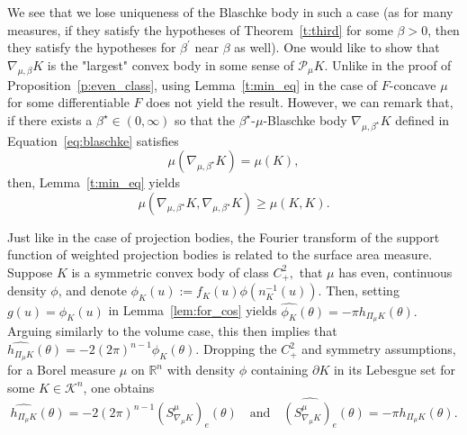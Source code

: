 \documentclass[11pt]{amsart}
\theoremstyle{definition}
\theoremstyle{remark}
\numberwithin{equation}{section}
\newcommand{\R}{\mathbb{R}}
\newcommand{\conbod}{\mathcal{K}^n}
\begin{document}
\noindent  We see that we lose uniqueness of the Blaschke body in such a case (as for many measures, if they satisfy the hypotheses of Theorem~\ref{t:third} for some $\beta>0$, then they satisfy the hypotheses for $\beta^\prime$ near $\beta$ as well). One would like to show that $\nabla_{\mu,\beta}K$ is the "largest" convex body in some sense of $\mathcal{P}_{\mu}K$. Unlike in the proof of Proposition~\ref{p:even_class}, using Lemma~\ref{t:min_eq} in the case of $F$-concave $\mu$ for some differentiable $F$ does not yield the result. However, we can remark that, if there exists a $\beta^\star\in(0,\infty)$ so that the $\beta^\star$-$\mu$-Blaschke body $\nabla_{\mu,\beta^\star} K$ defined in Equation~\ref{eq:blaschke} satisfies
$$\mu(\nabla_{\mu,\beta^\star} K)=\mu(K),$$
then, Lemma~\ref{t:min_eq} yields
$$\mu(\nabla_{\mu,\beta^\star} K,\nabla_{\mu,\beta^\star} K) \geq \mu(K,K).$$

Just like in the case of projection bodies, the Fourier transform of the support function of weighted projection bodies is related to the surface area measure. Suppose $K$ is a symmetric convex body of class $C^2_+,$ that $\mu$ has even, continuous density $\phi$, and denote $\phi_K(u):=f_K(u)\phi(n_K^{-1}(u))$. Then, setting $g(u)=\phi_K(u)$ in Lemma~\ref{lem:for_cos} yields
$\widehat{\phi_K}(\theta)=-\pi h_{\Pi_{\mu}K}(\theta).$ Arguing similarly to the volume case, this then implies that
$
\widehat{h_{\Pi_\mu K}}(\theta)=-2(2\pi)^{n-1}\phi_K(\theta).
$
Dropping the $C^2_+$ and symmetry assumptions, for a Borel measure $\mu$ on $\R^n$ with density $\phi$ containing $\partial K$ in its Lebesgue set for some $K\in\conbod$, one obtains
$$\widehat{h_{\Pi_\mu K}}(\theta)=-2(2\pi)^{n-1}(S^\mu_{\nabla_\mu K})_e(\theta) \quad \text{and} \quad \widehat{(S^\mu_{\nabla_\mu K})_e}(\theta)=-\pi h_{\Pi_\mu K}(\theta).$$
\end{document}
